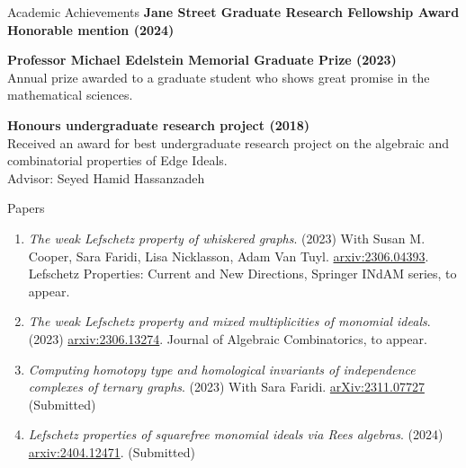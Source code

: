 \documentclass[12pt]{resume} %
\begin{document}


\begin{rSection}{Academic Achievements}
{\bf Jane Street Graduate Research Fellowship Award Honorable mention (2024)}

{\bf Professor Michael Edelstein Memorial Graduate Prize (2023)}
\\
Annual prize awarded to a graduate student who shows great promise in the mathematical sciences. 


{\bf Honours undergraduate research project (2018)}
\\
Received an award for best undergraduate research project on the algebraic and combinatorial properties of Edge Ideals.
\\
Advisor: Seyed Hamid Hassanzadeh
\end{rSection}

\begin{rSection}{Papers}

\begin{enumerate}
    \item \textit{The weak Lefschetz property of whiskered graphs}. (2023) With Susan M. Cooper, Sara Faridi, Lisa Nicklasson, Adam Van Tuyl.  \href{https://arxiv.org/abs/2306.04393}{arxiv:2306.04393}. Lefschetz Properties: Current and New Directions, Springer INdAM series, to appear. 
    \item \textit{The weak Lefschetz property and mixed multiplicities of monomial ideals}. (2023) \href{https://arxiv.org/abs/2306.13274}{arxiv:2306.13274}. Journal of Algebraic Combinatorics, to appear.
    \item \textit{Computing homotopy type and homological invariants of independence complexes of ternary graphs}. (2023) With Sara Faridi.  \href{https://arxiv.org/abs/2311.07727}{arXiv:2311.07727} (Submitted)
    \item \textit{Lefschetz properties of squarefree monomial ideals via Rees algebras}. (2024) \href{https://arxiv.org/abs/2404.12471}{arxiv:2404.12471}. (Submitted) 
\end{enumerate}
\end{rSection}
\end{document}

